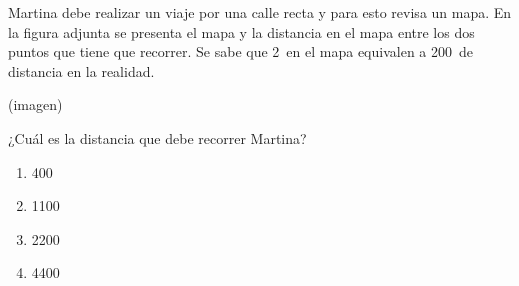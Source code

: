 \begin{problem}
    Martina debe realizar un viaje por una calle recta y para esto revisa un mapa. En la figura adjunta se presenta el mapa y la distancia en el mapa entre los dos puntos que tiene que recorrer. Se sabe que 2\, en el mapa equivalen a 200\, de distancia en la realidad.

    \begin{center}
    (imagen)
    \end{center}

    ¿Cuál es la distancia que debe recorrer Martina?

    \begin{enumerate}[label=\Alph*.]
        \item 400\,
        \item 1100\,
        \item 2200\,
        \item 4400\,
    \end{enumerate}
\end{problem}
